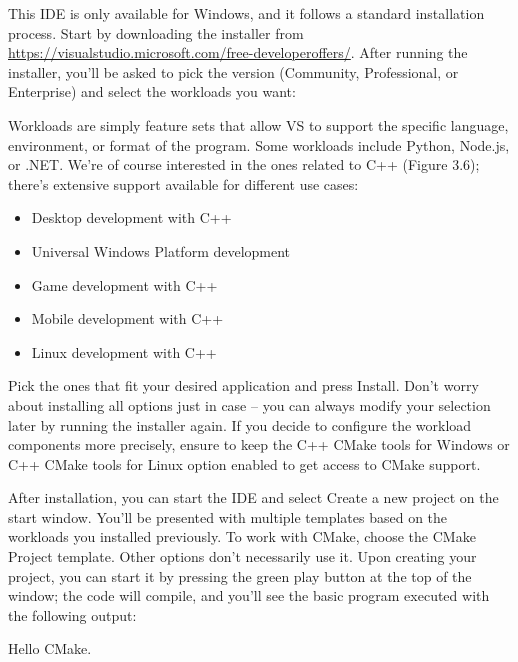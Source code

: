 
This IDE is only available for Windows, and it follows a standard installation process. Start by downloading the installer from \url{https://visualstudio.microsoft.com/free-developeroffers/}. After running the installer, you’ll be asked to pick the version (Community, Professional, or Enterprise) and select the workloads you want:


Workloads are simply feature sets that allow VS to support the specific language, environment, or format of the program. Some workloads include Python, Node.js, or .NET. We’re of course interested in the ones related to C++ (Figure 3.6); there’s extensive support available for different use cases:

\begin{itemize}
\item
Desktop development with C++

\item
Universal Windows Platform development

\item
Game development with C++

\item
Mobile development with C++

\item
Linux development with C++
\end{itemize}

Pick the ones that fit your desired application and press Install. Don’t worry about installing all options just in case – you can always modify your selection later by running the installer again. If you decide to configure the workload components more precisely, ensure to keep the C++ CMake tools for Windows or C++ CMake tools for Linux option enabled to get access to CMake support.

After installation, you can start the IDE and select Create a new project on the start window. You’ll be presented with multiple templates based on the workloads you installed previously. To work with CMake, choose the CMake Project template. Other options don’t necessarily use it. Upon creating your project, you can start it by pressing the green play button at the top of the window; the code will compile, and you’ll see the basic program executed with the following output:

\begin{cmake}
Hello CMake.
\end{cmake}

